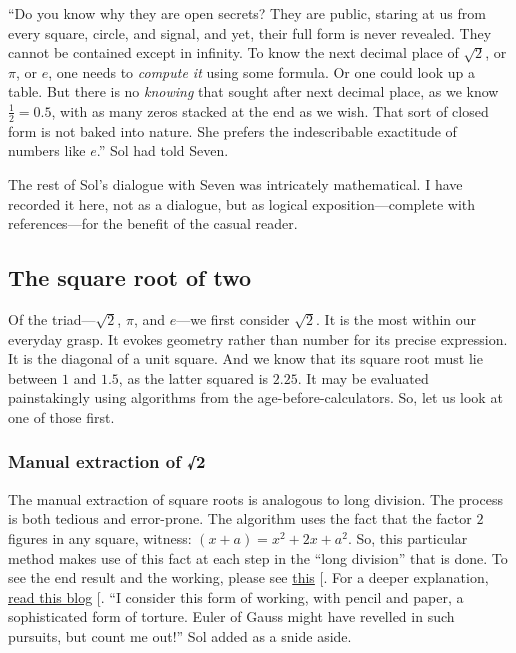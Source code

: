 \documentclass[
  a4paper,
]{article}
\begin{document}
``Do you know why they are open secrets? They are public, staring at us
from every square, circle, and signal, and yet, their full form is never
revealed. They cannot be contained except in infinity. To know the next
decimal place of \(\sqrt{2}\), or \(\pi\), or \(e\), one needs to
\emph{compute it} using some formula. Or one could look up a table. But
there is no \emph{knowing} that sought after next decimal place, as we
know \(\frac{1}{2} = 0.5\), with as many zeros stacked at the end as we
wish. That sort of closed form is not baked into nature. She prefers the
indescribable exactitude of numbers like \(e\).'' Sol had told Seven.

The rest of Sol's dialogue with Seven was intricately mathematical. I
have recorded it here, not as a dialogue, but as logical
exposition---complete with references---for the benefit of the casual
reader.

\subsection{The square root of two}\label{the-square-root-of-two}

Of the triad---\(\sqrt{2}\), \(\pi\), and \(e\)---we first consider
\(\sqrt{2}\). It is the most within our everyday grasp. It evokes
geometry rather than number for its precise expression. It is the
diagonal of a unit square. And we know that its square root must lie
between \(1\) and \(1.5\), as the latter squared is \(2.25\). It may be
evaluated painstakingly using algorithms from the
age-before-calculators. So, let us look at one of those first.

\subsubsection{Manual extraction of √2}\label{manual-extraction-of-2}

The manual extraction of square roots is analogous to long division. The
process is both tedious and error-prone. The algorithm uses the fact
that the factor \(2\) figures in any square, witness:
\((x + a) = x^2 + 2x +a^2\). So, this particular method makes use of
this fact at each step in the ``long division'' that is done. To see the
end result and the working, please see
\href{https://www.cuemath.com/algebra/square-root-of-2/}{this}
{[}\citeproc{ref-cuemathsqrt}{2}{]}. For a deeper explanation,
\href{https://www.cantorsparadise.com/the-square-root-algorithm-f97ab5c29d6d}{read
this blog} {[}\citeproc{ref-ujjwalsingh2021}{3}{]}. ``I consider this
form of working, with pencil and paper, a sophisticated form of torture.
Euler of Gauss might have revelled in such pursuits, but count me out!''
Sol added as a snide aside.
\end{document}
